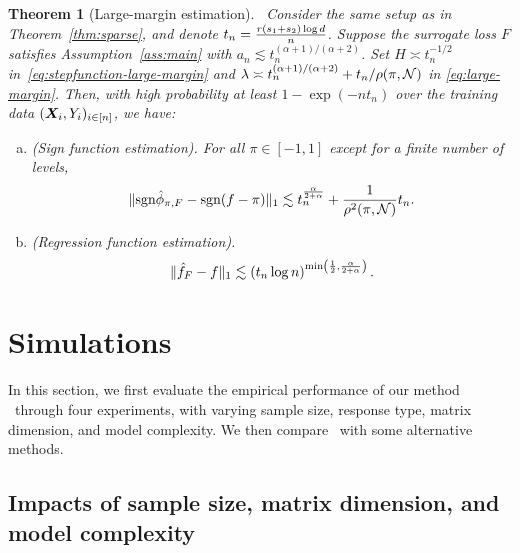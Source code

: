 \documentclass[aos]{imsart}
\newtheorem{theorem}{Theorem}%
\theoremstyle{definition}
\def\sign{\textup{sgn}}
\def\NonparaM{\text{\bf \footnotesize ASSIST}}
\begin{document}
\begin{theorem}[Large-margin estimation]~\label{thm:extension} 
Consider the same setup as in Theorem~\ref{thm:sparse}, and denote $t_n = {r(s_1+s_2)\log d \over n}$. Suppose the surrogate loss $F$ satisfies Assumption~\ref{ass:main} with $a_n \lesssim t_n^{(\alpha+1)/(\alpha+2)}$. Set $H\asymp t_n^{-1/2}$ in~\eqref{eq:stepfunction-large-margin} and $\lambda\asymp t_n^{(\alpha+1)/(\alpha+2)}+t_n/\rho(\pi,\mathcal{N})$ in \eqref{eq:large-margin}. Then, with high probability at least $1-\exp(-nt_n)$ over the training data $(\bm X_i,Y_i)_{i\in[n]}$, we have:
\begin{enumerate}[(a)]
\item (Sign function estimation). For all $\pi\in[-1,1]$ except for a finite number of levels,
\begin{equation*}
\onenormSize{}{\sign\hat \phi_{\pi,F}-\sign(f-\pi)}\lesssim t_n ^{\alpha\over 2+\alpha}+{1\over \rho^2(\pi,\tN)}t_n.
\end{equation*}

\item (Regression function estimation). 
\begin{equation*}
\onenormSize{}{\hat f_{F}- f} \lesssim  \left(t_n\log n\right)^{\min\left( {1\over 2},{\alpha \over 2+\alpha} \right)}.
\end{equation*}
\end{enumerate}
\end{theorem}





\section{Simulations}
\label{sec:simulation}

In this section, we first evaluate the empirical performance of our method \NonparaM\ through four experiments, with varying sample size, response type, matrix dimension, and model complexity. We then compare \NonparaM\ with some alternative methods. 



\subsection{Impacts of sample size, matrix dimension, and model complexity}
\label{sec:validation}
\end{document}
